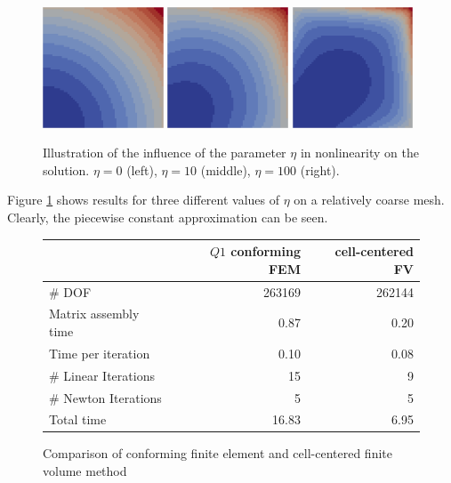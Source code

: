 \documentclass[a4paper,12pt]{article}
\begin{document}
\begin{figure}
\begin{center}
\includegraphics[width=0.32\textwidth]{eta0}\hfill
\includegraphics[width=0.32\textwidth]{eta10}\hfill
\includegraphics[width=0.32\textwidth]{eta100}
\end{center}
\caption{Illustration of the influence of the parameter $\eta$
in nonlinearity on the solution. $\eta=0$ (left), $\eta=10$ (middle), $\eta=100$ (right).}
\label{fig:Bunt}
\end{figure}

Figure \ref{fig:Bunt} shows results for three different values of $\eta$ on a relatively
coarse mesh. Clearly, the piecewise constant approximation can be seen.

\begin{figure}
\caption{Comparison of conforming finite element and cell-centered finite volume
method}
\label{fig:Compare}
\begin{center}
\begin{tabular}{l|r|r}
 & \multicolumn{1}{r|}{$Q1$ conforming FEM} & \multicolumn{1}{r}{cell-centered FV} \\
 \hline
 \# DOF & 263169 & 262144 \\
 Matrix assembly time & 0.87 & 0.20 \\
 Time per iteration & 0.10 & 0.08 \\
 \# Linear Iterations & 15 & 9 \\
 \# Newton Iterations & 5 & 5 \\
 Total time & 16.83 & 6.95
\end{tabular}
\end{center}
\end{figure}
\end{document}
